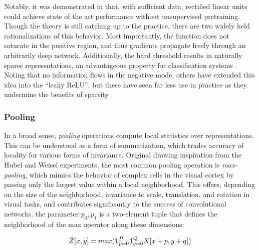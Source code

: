 \noindent Notably, it was demonstrated in \cite{Zeiler2013Rectified} that, with sufficient data, rectified linear units could achieve state of the art performance without unsupervised pretraining.
Though the theory is still catching up to the practice, there are two widely held rationalizations of this behavior.
Most importantly, the function does not saturate in the positive region, and thus gradients propagate freely through an arbitrarily deep network.
Additionally, the hard threshold results in naturally sparse representations, an advantageous property for classification systems \cite{Bengio2007Scaling}.
Noting that no information flows in the negative mode, others have extended this idea into the ``leaky ReLU'', but these have seen far less use in practice as they undermine the benefits of sparsity \cite{Maas2013Rectifier}.



\subsubsection{Pooling}


In a broad sense, \emph{pooling} operations compute local statistics over representations.
This can be understood as a form of summarization, which trades accuracy of locality for various forms of invariance.
Original drawing inspiration from the Hubel and Weisel experiments, the most common pooling operation is \emph{max-pooling}, which mimics the behavior of complex cells in the visual cortex by passing only the largest value within a local neighborhood.
This offers, depending on the size of the neighborhood, invariance to scale, translation, and rotation in visual tasks, and contributes significantly to the success of convolutional networks.
the parameter $p_0, p_1$ is a two-element tuple that defines the neighborhood of the max operator along these dimensions:


\begin{equation}
\label{eq:maxpool}
\small
\hat{Z}[x, y] = max (\mathbf{1}_{p=0}^{P} \mathbf{1}_{q=0}^{Q} X[x + p, y + q])
\end{equation}


